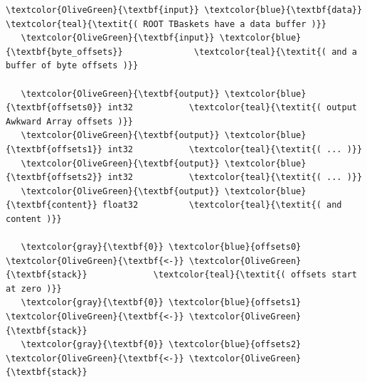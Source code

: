 \documentclass{webofc}
\begin{document}
\small
\begin{Verbatim}[commandchars=\\\{\}]
   \textcolor{OliveGreen}{\textbf{input}} \textcolor{blue}{\textbf{data}}                      \textcolor{teal}{\textit{( ROOT TBaskets have a data buffer )}}
   \textcolor{OliveGreen}{\textbf{input}} \textcolor{blue}{\textbf{byte_offsets}}              \textcolor{teal}{\textit{( and a buffer of byte offsets )}}

   \textcolor{OliveGreen}{\textbf{output}} \textcolor{blue}{\textbf{offsets0}} int32           \textcolor{teal}{\textit{( output Awkward Array offsets )}}
   \textcolor{OliveGreen}{\textbf{output}} \textcolor{blue}{\textbf{offsets1}} int32           \textcolor{teal}{\textit{( ... )}}
   \textcolor{OliveGreen}{\textbf{output}} \textcolor{blue}{\textbf{offsets2}} int32           \textcolor{teal}{\textit{( ... )}}
   \textcolor{OliveGreen}{\textbf{output}} \textcolor{blue}{\textbf{content}} float32          \textcolor{teal}{\textit{( and content )}}

   \textcolor{gray}{\textbf{0}} \textcolor{blue}{offsets0} \textcolor{OliveGreen}{\textbf{<-}} \textcolor{OliveGreen}{\textbf{stack}}             \textcolor{teal}{\textit{( offsets start at zero )}}
   \textcolor{gray}{\textbf{0}} \textcolor{blue}{offsets1} \textcolor{OliveGreen}{\textbf{<-}} \textcolor{OliveGreen}{\textbf{stack}}
   \textcolor{gray}{\textbf{0}} \textcolor{blue}{offsets2} \textcolor{OliveGreen}{\textbf{<-}} \textcolor{OliveGreen}{\textbf{stack}}


\end{Verbatim}
\end{document}

